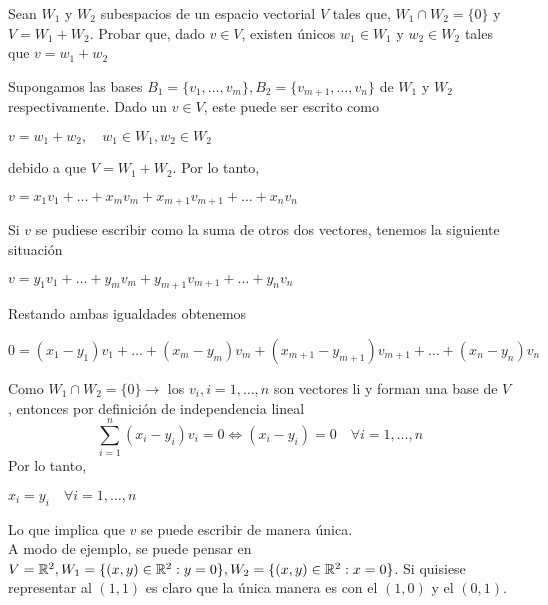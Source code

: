 \item Sean $W_1$ y $W_2$ subespacios de un espacio vectorial $V$ tales que, $W_1\cap W_2=\{0\}$ y $V=W_1+W_2$. Probar que, dado $v\in V$, existen únicos $w_1\in W_1$ y $w_2\in W_2$ tales que $v=w_1+w_2$
    \begin{mdframed}[style=s]
        Supongamos las bases $B_1=\{v_1,\dots,v_m\}, B_2=\{v_{m+1},\dots,v_n\}$ de $W_1$ y $W_2$ respectivamente. Dado un $v\in V$, este puede ser escrito como
        \begin{center}
            $v=w_1+w_2, \quad w_1\in W_1,w_2\in W_2$
        \end{center}
        debido a que $V=W_1+W_2$. Por lo tanto,
        \begin{center}
            $v=x_1v_1+\dots+x_mv_m+x_{m+1}v_{m+1}+\dots+x_nv_n$
        \end{center}
        Si $v$ se pudiese escribir como la suma de otros dos vectores, tenemos la siguiente situación
        \begin{center}
            $v=y_1v_1+\dots+y_mv_m+y_{m+1}v_{m+1}+\dots+y_nv_n$
        \end{center}
        Restando ambas igualdades obtenemos
        \begin{center}
            $0=(x_1-y_1)v_1+\dots+(x_m-y_m)v_m+(x_{m+1}-y_{m+1})v_{m+1}+\dots+(x_n-y_n)v_n$
        \end{center}
        Como $W_1\cap W_2=\{0\}\to$ los $v_i,i=1,\dots,n$ son vectores li y forman una base de $V$, entonces por definición de independencia lineal
        \begin{equation*}
            \sum_{i=1}^n(x_i-y_i)v_i=0\Leftrightarrow(x_i-y_i)=0\quad\forall i=1,\dots,n
        \end{equation*}
        Por lo tanto,
        \begin{center}
            $x_i=y_i\quad\forall i=1,\dots,n$
        \end{center}
        Lo que implica que $v$ se puede escribir de manera única.\vspace{6pt}\\
        A modo de ejemplo, se puede pensar en $V=\mathbb{R}^2,W_1=\{(x,y)\in\mathbb{R}^2:y=0\},W_2=\{(x,y)\in\mathbb{R}^2:x=0\}$. Si quisiese representar al $(1,1)$ es claro que la única manera es con el $(1,0)$ y el $(0,1)$.
    \end{mdframed}